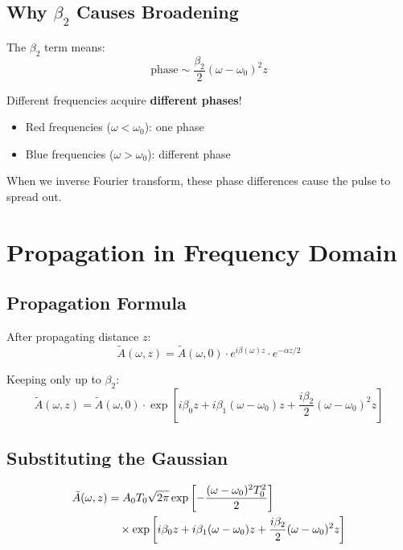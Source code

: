 \documentclass[12pt]{article}
\begin{document}
\subsection{Why $\beta_2$ Causes Broadening}

The $\beta_2$ term means:
$$\text{phase} \sim \frac{\beta_2}{2}(\omega - \omega_0)^2 z$$

Different frequencies acquire \textbf{different phases}!
\begin{itemize}
\item Red frequencies ($\omega < \omega_0$): one phase
\item Blue frequencies ($\omega > \omega_0$): different phase
\end{itemize}

When we inverse Fourier transform, these phase differences cause the pulse to spread out.

\section{Propagation in Frequency Domain}

\subsection{Propagation Formula}

After propagating distance $z$:
\begin{equation}
\tilde{A}(\omega, z) = \tilde{A}(\omega, 0) \cdot e^{i\beta(\omega)z} \cdot e^{-\alpha z/2}
\end{equation}

Keeping only up to $\beta_2$:
\begin{equation}
\tilde{A}(\omega, z) = \tilde{A}(\omega, 0) \cdot \exp\left[i\beta_0 z + i\beta_1(\omega-\omega_0)z + \frac{i\beta_2}{2}(\omega-\omega_0)^2 z\right]
\end{equation}

\subsection{Substituting the Gaussian}

\begin{align}
\tilde{A}(\omega, z) &= A_0 T_0 \sqrt{2\pi} \exp\left[-\frac{(\omega-\omega_0)^2 T_0^2}{2}\right] \notag \\
&\quad \times \exp\left[i\beta_0 z + i\beta_1(\omega-\omega_0)z + \frac{i\beta_2}{2}(\omega-\omega_0)^2 z\right]
\end{align}
\end{document}
